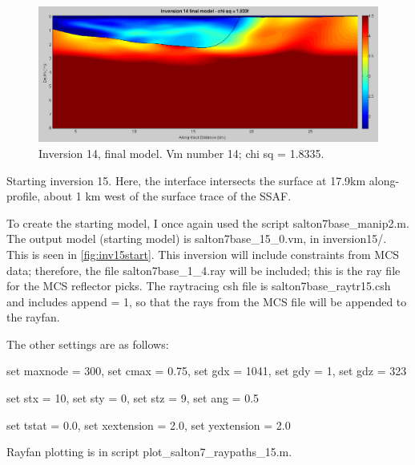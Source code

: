\documentclass[fontsize=11pt, %
                             paper=a4, %
                             twoside, %
                             captions=tableheading,
                             index=totoc,
                             hyperref]{labbook}
\begin{document}
\begin{addmargin}[4cm]{0cm}
\begin{figure}[h!]
\raggedleft
\includegraphics[scale=0.4,keepaspectratio=true]{figs/inv14_it13_FINAL.png}
\caption{Inversion 14, final model.  Vm number 14; chi sq = 1.8335.}
\label{fig:inv14final}
\end{figure}

\clearpage{}

%
%




Starting inversion 15.  Here, the interface intersects the surface at 17.9km along-profile, about 1 km west of the surface trace of the SSAF.  

To create the starting model, I once again used the script salton7base\_manip2.m.    The output model (starting model) is salton7base\_15\_0.vm, in inversion15/.  This is seen in \autoref{fig:inv15start}.  This inversion will include constraints from MCS data; therefore, the file salton7base\_1\_4.ray will be included; this is the ray file for the MCS reflector picks.  The raytracing csh file is salton7base\_raytr15.csh and includes append = 1, so that the rays from the MCS file will be appended to the rayfan.  

The other settings are as follows:

set maxnode = 300,        
set cmax = 0.75,
set gdx = 1041,
set gdy = 1,
set gdz = 323

set stx = 10,
set sty = 0,
set stz = 9,
set ang = 0.5

set tstat = 0.0,
set xextension = 2.0,
set yextension = 2.0


Rayfan plotting is in script 
plot\_salton7\_raypaths\_15.m.


\end{addmargin}
\end{document}
